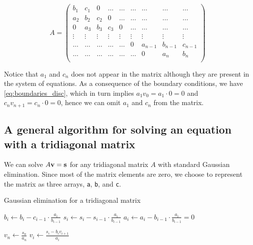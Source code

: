 \documentclass[a4paper]{article}
\begin{document}
\begin{equation}
     A = \left(\begin{array}{ccccccccc}
                   b_1 & c_1 & 0 &\dots   & \dots &\dots & \dots &\dots&\dots\\
                   a_2 & b_2 & c_2 & 0 &\dots &\dots & \dots&\dots&\dots \\
                   0 & a_3 & b_3 & c_3 & 0 & \dots & \dots&\dots&\dots \\
                   \vdots&\vdots&\vdots&\vdots&\vdots&\vdots&\vdots&\vdots&\vdots \\
                   \dots&\dots&\dots&\dots&\dots & 0 & a_{n-1}  &b_{n-1}& c_{n-1} \\
                   \dots&\dots&\dots&\dots&\dots&\dots &  0 &a_n & b_n \\
              \end{array} \right)
\end{equation}

Notice that $a_1$ and $c_{n}$ does not appear in the matrix although they are present in the system of equations. As a consequence of the boundary conditions, we have \eqref{eq:boundaries_disc}, which in turn implies $a_1 v_{0} = a_1 \cdot 0 = 0$ and $c_n v_{n+1} = c_n \cdot 0 = 0$, hence we can omit $a_1$ and $c_{n}$ from the matrix.



\subsection{A general algorithm for solving an equation with a tridiagonal matrix}
We can solve $A {\bf v} = {\bf s}$ for any tridiagonal matrix $A$ with standard Gaussian elimination. Since most of the matrix elements are zero, we choose to represent the matrix as three arrays, \texttt{a}, \texttt{b}, and \texttt{c}.

\begin{algorithm}
\caption{Gaussian elimination for a tridiagonal matrix} \label{alg:gaussian-general-tridiagonal}
\begin{algorithmic}[1]
   
    \State $b_i \gets b_i - c_{i-1}\cdot \frac{a_i}{b_{i-1}}$ 
    \State $s_i \gets s_i - s_{i-1}\cdot \frac{a_i}{b_{i-1}}$ 
    \State $a_i \gets a_i - b_{i-1}\cdot \frac{a_i}{b_{i-1}} = 0$ 
  \EndFor

  \Statex {}
  \State $v_n \gets \frac{s_n}{a_n}$
    \State $v_i \gets \frac{s_i - b_i v_{i+1}}{a_i}$
  \EndFor
\end{algorithmic}
\end{algorithm}
\end{document}
